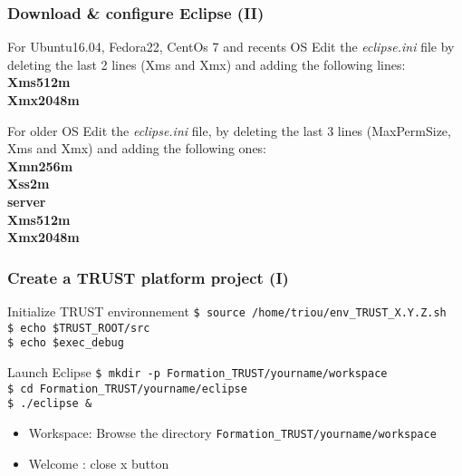 \documentclass[10pt, hyperref={unicode=true,pdfusetitle, bookmarks=true,bookmarksnumbered=false,bookmarksopen=false, breaklinks=false,pdfborder={0 0 1},backref=true,colorlinks=true,linkcolor=darkblue,pageanchor, urlcolor=darkblue}]{beamer}
\begin{document}
\begin{frame}
\frametitle{Download \& configure Eclipse (II)}

\begin{exampleblock}{For Ubuntu16.04, Fedora22, CentOs 7 and recents OS}
Edit the \textit{eclipse.ini} file by deleting the last 2 lines (Xms and Xmx) and adding the following lines:\\
\textbf{Xms512m} \\
\textbf{Xmx2048m}
\end{exampleblock}

\begin{exampleblock}{For older OS}
Edit the \textit{eclipse.ini} file, by deleting the last 3 lines (MaxPermSize, Xms and Xmx) and adding the following ones: \\
\textbf{Xmn256m} \\
\textbf{Xss2m}\\
\textbf{server}\\
\textbf{Xms512m}\\
\textbf{Xmx2048m}
\end{exampleblock}

\end{frame}
\begin{frame}
\frametitle{Create a TRUST platform project (I)}

\begin{block}{Initialize TRUST environnement}
\texttt{\$ source /home/triou/env\_TRUST\_X.Y.Z.sh} \\
\texttt{\$ echo \$TRUST\_ROOT/src} \\
\texttt{\$ echo \$exec\_debug} \\
\end{block}

\begin{exampleblock}{Launch Eclipse}
\texttt{\$ mkdir -p Formation\_TRUST/yourname/workspace}\\
\texttt{\$ cd Formation\_TRUST/yourname/eclipse}\\
\texttt{\$ ./eclipse \&}
%
\begin{itemize}
\item Workspace: Browse the directory \texttt{Formation\_TRUST/yourname/workspace} 
\item Welcome : close x button
\end{itemize}
%
\end{exampleblock}

\end{frame}
\end{document}
